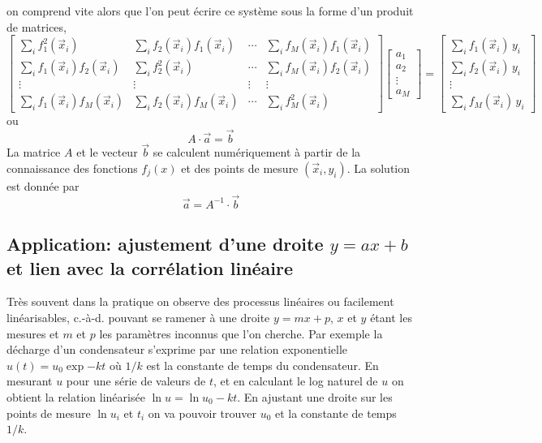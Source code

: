 \documentclass[main.tex]{subfiles}
\begin{document}
on comprend vite alors que l'on peut écrire ce système sous la forme d'un produit de matrices,
\begin{equation}
    \begin{bmatrix}
        \sum_i f_1^2(\vec{x}_i)               & \sum_i f_2(\vec{x}_i)f_1(\vec{x}_i)   & \cdots & \sum_i f_{M}(\vec{x}_i)f_1(\vec{x}_i) \\
        \sum_i f_1(\vec{x}_i)f_2(\vec{x}_i)   & \sum_i f_2^2(\vec{x}_i)               & \cdots & \sum_i f_{M}(\vec{x}_i)f_2(\vec{x}_i) \\
        \vdots                                & \vdots                                & \vdots & \vdots                                \\
        \sum_i f_1(\vec{x}_i)f_{M}(\vec{x}_i) & \sum_i f_2(\vec{x}_i)f_{M}(\vec{x}_i) & \cdots & \sum_i f_{M}^2(\vec{x}_i)
    \end{bmatrix}
    \begin{bmatrix} a_1 \\ a_2 \\ \vdots \\ a_{M}\end{bmatrix}=
    \begin{bmatrix}
        \sum_if_1(\vec{x}_i)\,y_i \\
        \sum_if_2(\vec{x}_i)\,y_i \\
        \vdots                    \\
        \sum_if_{M}(\vec{x}_i)\,y_i
    \end{bmatrix}\label{eq:emplrdp}
\end{equation}
ou
\begin{equation}
    A\cdot\vec{a}=\vec{b}
\end{equation}
La matrice $A$ et le vecteur $\vec{b}$ se calculent numériquement à partir de la connaissance des fonctions $f_j(x)$ et des points de mesure $(\vec{x}_i,y_i)$. La solution est donnée par
\begin{equation}
    \vec{a}=A^{-1}\cdot\vec{b}
\end{equation}

\subsection{Application: ajustement d'une droite $y=ax+b$ et lien avec la corrélation linéaire}

Très souvent dans la pratique on observe des processus linéaires ou facilement linéarisables, c.-à-d. pouvant se ramener à une droite $y=mx+p$, $x$ et $y$ étant les mesures et $m$ et $p$ les paramètres inconnus que l'on cherche. Par exemple la décharge d'un condensateur s'exprime par une relation exponentielle $u(t)=u_0\exp{-kt}$ où $1/k$ est la constante de temps du condensateur. En mesurant $u$ pour une série de valeurs de $t$, et en calculant le log naturel de $u$ on obtient la relation linéarisée $\ln{u}=\ln{u_0}-kt$. En ajustant une droite sur les points de mesure $\ln{u_i}$ et $t_i$ on va pouvoir trouver $u_0$ et la constante de temps $1/k$.
\end{document}
